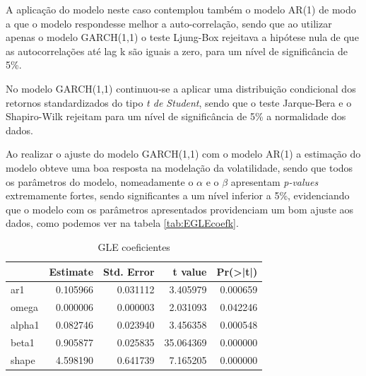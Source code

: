 \documentclass[
  12pt,
  a4paper,
  openany]{book}
\newenvironment{Shaded}{\begin{snugshade}}{\end{snugshade}}
\newcommand{\CommentTok}[1]{\textcolor[rgb]{0.56,0.35,0.01}{\textit{#1}}}
\newcommand{\DataTypeTok}[1]{\textcolor[rgb]{0.13,0.29,0.53}{#1}}
\newcommand{\DecValTok}[1]{\textcolor[rgb]{0.00,0.00,0.81}{#1}}
\newcommand{\KeywordTok}[1]{\textcolor[rgb]{0.13,0.29,0.53}{\textbf{#1}}}
\newcommand{\NormalTok}[1]{#1}
\newcommand{\OperatorTok}[1]{\textcolor[rgb]{0.81,0.36,0.00}{\textbf{#1}}}
\newcommand{\OtherTok}[1]{\textcolor[rgb]{0.56,0.35,0.01}{#1}}
\newcommand{\StringTok}[1]{\textcolor[rgb]{0.31,0.60,0.02}{#1}}
\begin{document}
A aplicação do modelo neste caso contemplou também o modelo AR(1) de modo a que o modelo respondesse melhor a auto-correlação, sendo que ao utilizar apenas o modelo GARCH(1,1) o teste Ljung-Box rejeitava a hipótese nula de que as autocorrelações até lag k são iguais a zero, para um nível de significância de 5\%.

No modelo GARCH(1,1) continuou-se a aplicar uma distribuição condicional dos retornos standardizados do tipo \emph{t de Student}, sendo que o teste Jarque-Bera e o Shapiro-Wilk rejeitam para um nível de significância de 5\% a normalidade dos dados.

Ao realizar o ajuste do modelo GARCH(1,1) com o modelo AR(1) a estimação do modelo obteve uma boa resposta na modelação da volatilidade, sendo que todos os parâmetros do modelo, nomeadamente o \(\alpha\) e o \(\beta\) apresentam \emph{p-values} extremamente fortes, sendo significantes a um nível inferior a 5\%, evidenciando que o modelo com os parâmetros apresentados providenciam um bom ajuste aos dados, como podemos ver na tabela \ref{tab:EGLEcoefk}.

\scriptsize

\begin{Shaded}
\end{Shaded}

\normalsize

\begin{table}[!h]

\caption{\label{tab:GLEcoefk}GLE coeficientes}
\centering
\begin{tabular}[t]{lrrrr}
\toprule
  &  Estimate &  Std. Error &  t value & Pr(>|t|)\\
\midrule
ar1 & 0.105966 & 0.031112 & 3.405979 & 0.000659\\
omega & 0.000006 & 0.000003 & 2.031093 & 0.042246\\
alpha1 & 0.082746 & 0.023940 & 3.456358 & 0.000548\\
beta1 & 0.905877 & 0.025835 & 35.064369 & 0.000000\\
shape & 4.598190 & 0.641739 & 7.165205 & 0.000000\\
\bottomrule
\end{tabular}
\end{table}
\FloatBarrier
\centering
\end{document}
